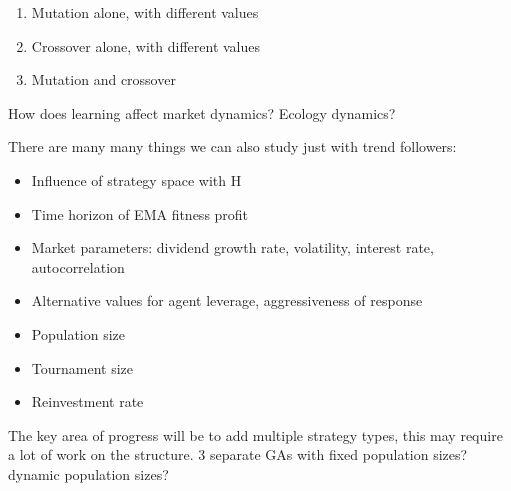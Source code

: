 \documentclass{article}
\begin{document}
\begin{enumerate}
    \item Mutation alone, with different values
    \item Crossover alone, with different values
    \item Mutation and crossover
\end{enumerate}

How does learning affect market dynamics? Ecology dynamics?

There are many many things we can also study just with trend followers:
\begin{itemize}
    \item Influence of strategy space with H
    \item Time horizon of EMA fitness profit
    \item Market parameters: dividend growth rate, volatility, interest rate, autocorrelation
    \item Alternative values for agent leverage, aggressiveness of response 
    \item Population size
    \item Tournament size
    \item Reinvestment rate
\end{itemize}

The key area of progress will be to add multiple strategy types, this may require a lot of work on the structure. 3 separate GAs with fixed population sizes? dynamic population sizes?

\printbibliography
\end{document}
